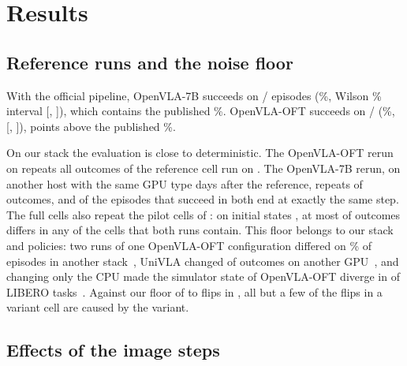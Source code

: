 \section{Results}
\label{sec:results}

\subsection{Reference runs and the noise floor}
\label{sec:repro}

With the official pipeline, OpenVLA-7B succeeds on \SevRefK/\NPairs{} episodes (\SevRefPct\%, Wilson \AlphaPct\% interval [\SevRefLo, \SevRefHi]), which contains the published \ExtOpenvlaSpatial\%. OpenVLA-OFT succeeds on \OftRefK/\NPairs{} (\OftRefPct\%, [\OftRefLo, \OftRefHi]), \OftRefVsPub{} points above the published \ExtOftSpatial\%.

On our stack the evaluation is close to deterministic. The OpenVLA-OFT rerun on \OftRerunDate{} repeats all \NPairs{} outcomes of the reference cell run on \OftRefDates. The OpenVLA-7B rerun, on another host with the same GPU type \RerunGapDays{} days after the reference, repeats \SevRerunSame{} of \NPairs{} outcomes, and \RerunSameStep{} of the \RerunBoth{} episodes that succeed in both end at exactly the same step. The full cells also repeat the pilot cells of \PilotDate{}: on initial states \SplitA, at most \PilotMaxDiffVsFinal{} of \PilotPairs{} outcomes differs in any of the cells that both runs contain. This floor belongs to our stack and policies: two runs of one OpenVLA-OFT configuration differed on \ExtLiRerunPct\% of episodes in another stack~\citep{li2026paraphrase}, UniVLA changed \ExtCtrlUnivlaOtherGpu{} of \NPairs{} outcomes on another GPU~\citep{liberoctrlrepo}, and changing only the CPU made the simulator state of OpenVLA-OFT diverge in \ExtJiangCpuTasks{} of \NTasks{} LIBERO tasks~\citep{jiang2026bench}. Against our floor of \OftRerunFlips{} to \SevRerunFlips{} flips in \NPairs, all but a few of the flips in a variant cell are caused by the variant\HookCpuFloor.



\subsection{Effects of the image steps}
\label{sec:effects}

